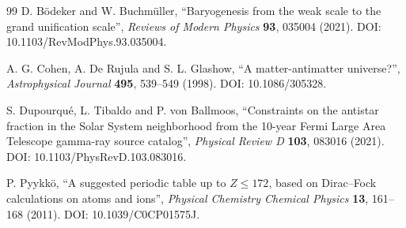\documentclass[11pt,a4paper]{article}
\begin{document}
\begin{thebibliography}{99}
D. B\"odeker and W. Buchm\"uller, \enquote{Baryogenesis from the weak scale to the grand unification scale}, \emph{Reviews of Modern Physics} \textbf{93}, 035004 (2021). DOI: 10.1103/RevModPhys.93.035004.

A. G. Cohen, A. De Rujula and S. L. Glashow, \enquote{A matter-antimatter universe?}, \emph{Astrophysical Journal} \textbf{495}, 539--549 (1998). DOI: 10.1086/305328.

S. Dupourqu\'e, L. Tibaldo and P. von Ballmoos, \enquote{Constraints on the antistar fraction in the Solar System neighborhood from the 10-year Fermi Large Area Telescope gamma-ray source catalog}, \emph{Physical Review D} \textbf{103}, 083016 (2021). DOI: 10.1103/PhysRevD.103.083016.

P. Pyykk\"o, \enquote{A suggested periodic table up to $Z\leq172$, based on Dirac--Fock calculations on atoms and ions}, \emph{Physical Chemistry Chemical Physics} \textbf{13}, 161--168 (2011). DOI: 10.1039/C0CP01575J.

\end{thebibliography}
\fussy
\end{document}
